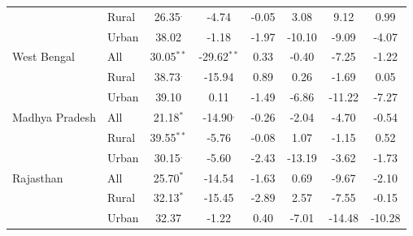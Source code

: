 \begin{tabular}{llS[table-format=3.2]S[table-format=3.2]S[table-format=3.2]S[table-format=3.2]S[table-format=3.2]S[table-format=3.2]}
 & Rural & 26.35${}^{.}$ & -4.74${}^{}$ & -0.05${}^{}$ & 3.08${}^{}$ & 9.12${}^{}$ & 0.99${}^{}$\\
 & Urban & 38.02${}^{}$ & -1.18${}^{}$ & -1.97${}^{}$ & -10.10${}^{}$ & -9.09${}^{}$ & -4.07${}^{}$\\
\addlinespace
West Bengal & All & 30.05${}^{**}$ & -29.62${}^{**}$ & 0.33${}^{}$ & -0.40${}^{}$ & -7.25${}^{}$ & -1.22${}^{}$\\
 & Rural & 38.73${}^{.}$ & -15.94${}^{}$ & 0.89${}^{}$ & 0.26${}^{}$ & -1.69${}^{}$ & 0.05${}^{}$\\
 & Urban & 39.10${}^{}$ & 0.11${}^{}$ & -1.49${}^{}$ & -6.86${}^{}$ & -11.22${}^{}$ & -7.27${}^{}$\\
\addlinespace
Madhya Pradesh & All & 21.18${}^{*}$ & -14.90${}^{.}$ & -0.26${}^{}$ & -2.04${}^{}$ & -4.70${}^{}$ & -0.54${}^{}$\\
 & Rural & 39.55${}^{**}$ & -5.76${}^{}$ & -0.08${}^{}$ & 1.07${}^{}$ & -1.15${}^{}$ & 0.52${}^{}$\\
 & Urban & 30.15${}^{.}$ & -5.60${}^{}$ & -2.43${}^{}$ & -13.19${}^{}$ & -3.62${}^{}$ & -1.73${}^{}$\\
\addlinespace
Rajasthan & All & 25.70${}^{*}$ & -14.54${}^{}$ & -1.63${}^{}$ & 0.69${}^{}$ & -9.67${}^{}$ & -2.10${}^{}$\\
 & Rural & 32.13${}^{*}$ & -15.45${}^{}$ & -2.89${}^{}$ & 2.57${}^{}$ & -7.55${}^{}$ & -0.15${}^{}$\\
 & Urban & 32.37${}^{}$ & -1.22${}^{}$ & 0.40${}^{}$ & -7.01${}^{}$ & -14.48${}^{}$ & -10.28${}^{}$\\
\bottomrule
\end{tabular}
